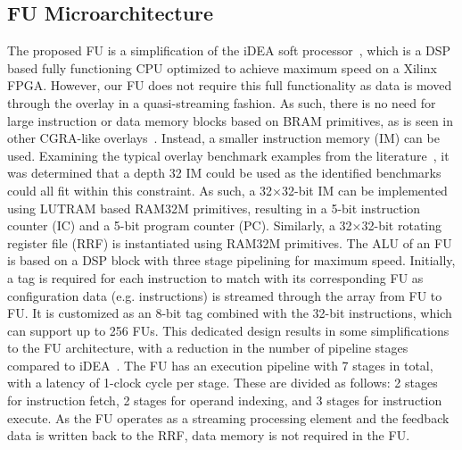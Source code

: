 \subsection{FU Microarchitecture}
The proposed FU is a simplification of the iDEA soft processor~\cite{cheah2012idea}, which is a DSP based fully functioning CPU optimized to achieve maximum speed on a Xilinx FPGA. 
However, our FU does not require this full functionality as data is moved through the overlay in a quasi-streaming fashion. 
As such, there is no need for large instruction or data memory blocks based on BRAM primitives, as is seen in other CGRA-like overlays~\cite{liu2013soft,paul2012remorph}. 
Instead, a smaller instruction memory (IM) can be used. 
Examining the typical overlay benchmark examples from the literature~\cite{binipolynomial, gopalakrishnan2007finding}, it was determined that a depth 32 IM could be used as the identified benchmarks could all fit within this constraint. 
As such, a 32$\times$32-bit IM can be implemented using LUTRAM based RAM32M primitives, resulting in a 5-bit instruction counter (IC) and a 5-bit program counter (PC). 
Similarly, a 32$\times$32-bit rotating register file (RRF) is instantiated using RAM32M primitives. 
The ALU of an FU is based on a DSP block with three stage pipelining for maximum speed. 
Initially, a tag is required for each instruction to match with its corresponding FU as configuration data (e.g. instructions) is streamed through the array from FU to FU. 
It is customized as an 8-bit tag combined with the 32-bit instructions, which can support up to 256 FUs. 
This dedicated design results in some simplifications to the FU architecture, with a reduction in the number of pipeline stages compared to iDEA~\cite{cheah2012idea}.
The FU has an execution pipeline with 7 stages in total, with a latency of 1-clock cycle per stage. These are divided as follows: 2 stages for instruction fetch, 2 stages for operand indexing, and 3 stages for instruction execute.
As the FU operates as a streaming processing element and the feedback data is written back to the RRF, data memory is not required in the FU. 



